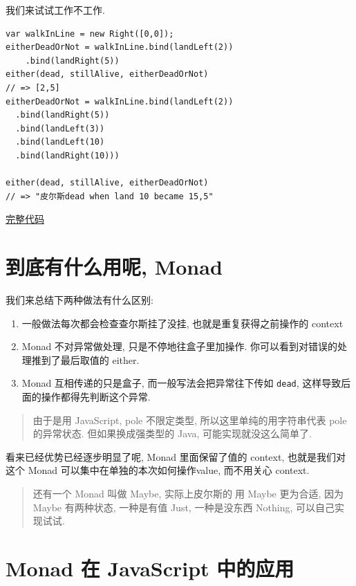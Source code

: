 \documentclass[a5paper]{book}
\begin{document}
我们来试试工作不工作.

\begin{verbatim}
var walkInLine = new Right([0,0]);
eitherDeadOrNot = walkInLine.bind(landLeft(2))
    .bind(landRight(5))
either(dead, stillAlive, eitherDeadOrNot)
// => [2,5]
eitherDeadOrNot = walkInLine.bind(landLeft(2))
  .bind(landRight(5))
  .bind(landLeft(3))
  .bind(landLeft(10)
  .bind(landRight(10)))

either(dead, stillAlive, eitherDeadOrNot)
// => "皮尔斯dead when land 10 became 15,5"
\end{verbatim}

\href{http://jsbin.com/giyig/3/watch}{完整代码}

\chapter{到底有什么用呢, Monad}
\label{sec:orgheadline40}

我们来总结下两种做法有什么区别:

\begin{enumerate}
\item 一般做法每次都会检查查尔斯挂了没挂, 也就是重复获得之前操作的 context
\item Monad 不对异常做处理, 只是不停地往盒子里加操作. 你可以看到对错误的处理推到了最后取值的 either.
\item Monad 互相传递的只是盒子, 而一般写法会把异常往下传如 \texttt{dead}, 这样导致后面的操作都得先判断这个异常.
\end{enumerate}

\begin{quote}
由于是用 JavaScript, pole 不限定类型,
所以这里单纯的用字符串代表 pole 的异常状态. 但如果换成强类型的 Java,
可能实现就没这么简单了.
\end{quote}

看来已经优势已经逐步明显了呢, Monad 里面保留了值的 context,
也就是我们对这个 Monad 可以集中在单独的本次如何操作value, 而不用关心
context.

\begin{quote}
还有一个 Monad 叫做 Maybe, 实际上皮尔斯的🌰用 Maybe 更为合适, 因为
Maybe 有两种状态, 一种是有值 Just, 一种是没东西 Nothing,
可以自己实现试试.
\end{quote}

\chapter{Monad 在 JavaScript 中的应用}
\label{sec:orgheadline41}
\end{document}

